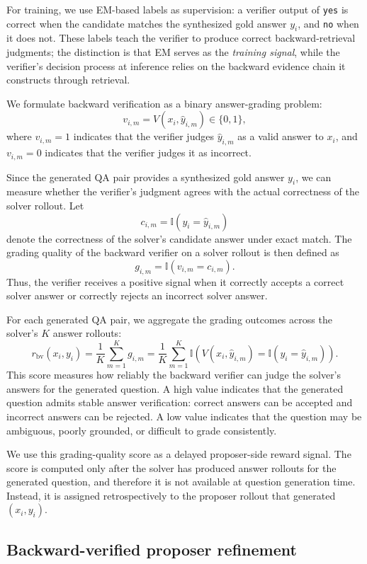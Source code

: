 \documentclass{article}
\begin{document}
For training, we use EM-based labels as supervision: a verifier output of \texttt{yes} is correct when the candidate matches the synthesized gold answer $y_i$, and \texttt{no} when it does not.
These labels teach the verifier to produce correct backward-retrieval judgments; the distinction is that EM serves as the \emph{training signal}, while the verifier's decision process at inference relies on the backward evidence chain it constructs through retrieval.

We formulate backward verification as a binary answer-grading problem:
\[
v_{i,m}
=
V(x_i,\hat{y}_{i,m})
\in \{0,1\},
\]
where $v_{i,m}=1$ indicates that the verifier judges $\hat{y}_{i,m}$ as a
valid answer to $x_i$, and $v_{i,m}=0$ indicates that the verifier judges it as
incorrect.

Since the generated QA pair provides a synthesized gold answer $y_i$, we can
measure whether the verifier's judgment agrees with the actual correctness of
the solver rollout. Let
\[
c_{i,m}
=
\mathbb{I}(y_i=\hat{y}_{i,m})
\]
denote the correctness of the solver's candidate answer under exact match.
The grading quality of the backward verifier on a solver rollout is then
defined as
\[
g_{i,m}
=
\mathbb{I}(v_{i,m}=c_{i,m}).
\]
Thus, the verifier receives a positive signal when it correctly accepts a
correct solver answer or correctly rejects an incorrect solver answer.

For each generated QA pair, we aggregate the grading outcomes across the
solver's $K$ answer rollouts:
\[
r_{\mathrm{bv}}(x_i,y_i)
=
\frac{1}{K}
\sum_{m=1}^{K}
g_{i,m}
=
\frac{1}{K}
\sum_{m=1}^{K}
\mathbb{I}
\left(
V(x_i,\hat{y}_{i,m})
=
\mathbb{I}(y_i=\hat{y}_{i,m})
\right).
\]
This score measures how reliably the backward verifier can judge the solver's
answers for the generated question. A high value indicates that the generated
question admits stable answer verification: correct answers can be accepted and
incorrect answers can be rejected. A low value indicates that the question may
be ambiguous, poorly grounded, or difficult to grade consistently.

We use this grading-quality score as a delayed proposer-side reward signal.
The score is computed only after the solver has produced answer rollouts for
the generated question, and therefore it is not available at question
generation time. Instead, it is assigned retrospectively to the proposer rollout
that generated $(x_i,y_i)$.

\subsection{Backward-verified proposer refinement}
\end{document}
